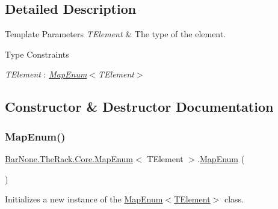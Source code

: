 \subsection{Detailed Description}



\begin{DoxyTemplParams}{Template Parameters}
{\em T\+Element} & The type of the element.\\
\hline
\end{DoxyTemplParams}
\begin{Desc}
\item[Type Constraints]\begin{description}
\item[{\em T\+Element} : {\em \mbox{\hyperlink{class_bar_none_1_1_the_rack_1_1_core_1_1_map_enum}{Map\+Enum}}$<$T\+Element$>$}]\end{description}
\end{Desc}


\subsection{Constructor \& Destructor Documentation}
\mbox{\label{class_bar_none_1_1_the_rack_1_1_core_1_1_map_enum_ae558c9ed80801b7e8180f3fc48e31e1e}} 
\subsubsection{\texorpdfstring{Map\+Enum()}{MapEnum()}}
{\footnotesize\ttfamily \mbox{\hyperlink{class_bar_none_1_1_the_rack_1_1_core_1_1_map_enum}{Bar\+None.\+The\+Rack.\+Core.\+Map\+Enum}}$<$ T\+Element $>$.\mbox{\hyperlink{class_bar_none_1_1_the_rack_1_1_core_1_1_map_enum}{Map\+Enum}} (\begin{DoxyParamCaption}{ }\end{DoxyParamCaption})}



Initializes a new instance of the \mbox{\hyperlink{class_bar_none_1_1_the_rack_1_1_core_1_1_map_enum_ae558c9ed80801b7e8180f3fc48e31e1e}{Map\+Enum$<$\+T\+Element$>$}} class. 



